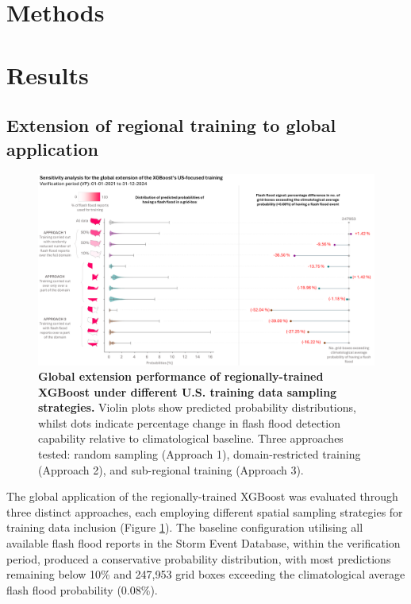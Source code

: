 \section{Methods}


\section{Results}

\subsection{Extension of regional training to global application}

\begin{figure}[htbp]
\centering
\includegraphics[width=\textwidth]{sensitivity_analysis_global_extension.png}
\caption{\textbf{Global extension performance of regionally-trained XGBoost under different U.S. training data sampling strategies.} Violin plots show predicted probability distributions, whilst dots indicate percentage change in flash flood detection capability relative to climatological baseline. Three approaches tested: random sampling (Approach 1), domain-restricted training (Approach 2), and sub-regional training (Approach 3).}
\label{fig:sensitivity_analysis_global_extension}
\end{figure}

The global application of the regionally-trained XGBoost was evaluated through three distinct approaches, each employing different spatial sampling strategies for training data inclusion (Figure \ref{fig:sensitivity_analysis_global_extension}). The baseline configuration utilising all available flash flood reports in the Storm Event Database, within the verification period, produced a conservative probability distribution, with most predictions remaining below 10\% and 247,953 grid boxes exceeding the climatological average flash flood probability (0.08\%).


